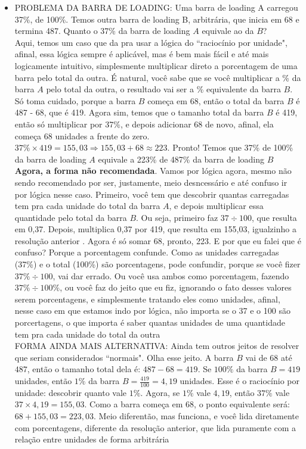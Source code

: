 \documentclass{article}
\begin{document}
\begin{itemize}
    \item PROBLEMA DA BARRA DE LOADING: Uma barra de loading A carregou 37\%, de 100\%. Temos outra barra de loading B, arbitrária, que inicia em 68 e termina 487. Quanto o 37\% da barra de loading $A$ equivale ao da $B$?
    \\[5pt]
    Aqui, temos um caso que da pra usar a lógica do ``raciocínio por unidade", afinal, essa lógica sempre é aplicável, mas é bem mais fácil e até mais logicamente intuitivo, simplesmente multiplicar direto a porcentagem de uma barra pelo total da outra. É natural, você sabe que se você multiplicar a \% da barra $A$ pelo total da outra, o resultado vai ser a \% equivalente da barra $B$. Só toma cuidado, porque a barra $B$ começa em 68, então o total da barra $B$ é 487 - 68, que é 419. Agora sim, temos que o tamanho total da barra $B$ é 419, então só multiplicar por 37\%, e depois adicionar 68 de novo, afinal, ela começa 68 unidades a frente do zero. $37\% \times 419 = 155,03 \Rightarrow 155,03 + 68 \approx 223$. Pronto! Temos que 37\% de 100\% da barra de loading $A$ equivale a 223\% de 487\% da barra de loading $B$
    \\[5pt]
    \textbf{Agora, a forma não recomendada}. Vamos por lógica agora, mesmo não sendo recomendado por ser, justamente, meio desncessário e até confuso ir por lógica nesse caso. Primeiro, você tem que descobrir quantas carregadas tem pra cada unidade do total da barra $A$, e depois multiplicar essa quantidade pelo total da barra $B$. Ou seja, primeiro faz $37\div100$, que resulta em 0,37. Depois, multiplica 0,37 por 419, que resulta em 155,03, igualzinho a resolução anterior . Agora é só somar 68, pronto, 223. E por que eu falei que é confuso? Porque a porcentagem confunde. Como as unidades carregadas (37\%) e o total (100\%) são porcentagens, pode confundir, porque se você fizer $37\%\div100$, vai dar errado. Ou você usa ambos como porcentagem, fazendo $37\%\div100\%$, ou você faz do jeito que eu fiz, ignorando o fato desses valores serem porcentagens, e simplesmente tratando eles como unidades, afinal, nesse caso em que estamos indo por lógica, não importa se o 37 e o 100 são porcertagens, o que importa é saber quantas unidades de uma quantidade tem pra cada unidade do total da outra
    \\[5pt]
    FORMA AINDA MAIS ALTERNATIVA: Ainda tem outros jeitos de resolver que seriam considerados ``normais". Olha esse jeito. A barra $B$ vai de $68$ até $487$, então o tamanho total dela é: $487 - 68 = 419$. Se $100\%$ da barra $B = 419$ unidades, então $1\%$ da barra $B = \frac{419}{100} = 4{,}19$ unidades. Esse é o raciocínio por unidade: descobrir quanto vale $1\%$. Agora, se $1\%$ vale $4{,}19$, então $37\%$ vale $37 \times 4{,}19 = 155{,}03$. Como a barra começa em $68$, o ponto equivalente será: $68 + 155{,}03 = 223{,}03$. Meio diferentão, mas funciona, e você lida diretamente com porcentagens, diferente da resolução anterior, que lida puramente com a relação entre unidades de forma arbitrária


\end{itemize}
\end{document}
